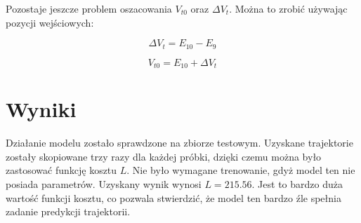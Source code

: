\noindent
Pozostaje jeszcze problem oszacowania $V_{t0}$ oraz $\Delta V_{t}$. Można to zrobić używając pozycji wejściowych:

\begin{equation}
\Delta V_{t} = E_{10} - E_{9}
\end{equation}

\vspace*{-5mm}

\begin{equation}
V_{t0} = E_{10} + \Delta V_{t}
\end{equation}

\vspace*{-5mm}

\section{Wyniki}
Działanie modelu zostało sprawdzone na zbiorze testowym. Uzyskane trajektorie zostały skopiowane trzy razy dla każdej próbki, dzięki czemu można było zastosować funkcję kosztu $L$. Nie było wymagane trenowanie, gdyż model ten nie posiada parametrów. Uzyskany wynik wynosi $L = 215.56$. Jest to bardzo duża wartość funkcji kosztu, co pozwala stwierdzić, że model ten bardzo źle spełnia zadanie predykcji trajektorii.